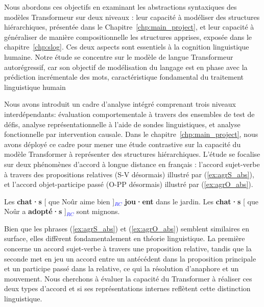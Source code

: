 Nous abordons ces objectifs en examinant les abstractions syntaxiques des modèles Transformeur sur deux niveaux : leur capacité à modéliser des structures hiérarchiques, présentée dans le Chapitre~\ref{chp:main_project}, et leur capacité à généraliser de manière compositionnelle les structures apprises, exposée dans le chapitre~\ref{chp:slog}. Ces deux aspects sont essentiels à la cognition linguistique humaine. Notre étude se concentre sur le modèle de langue Transformeur autorégressif, car son objectif de modélisation du langage est en phase avec la prédiction incrémentale des mots, caractéristique fondamental du traitement linguistique humain~\citep{hale2001probabilistic,kuperberg2016we,levy2008expectation}

Nous avons introduit un cadre d'analyse intégré comprenant trois niveaux interdépendants: évaluation comportementale à travers des ensembles de test de défis, analyse représentationnelle à l'aide de sondes linguistiques, et analyse fonctionnelle par intervention causale. Dans le chapitre~\ref{chp:main_project}, nous avons déployé ce cadre pour mener une étude contrastive sur la capacité du modèle Transformer à représenter des structures hiérarchiques. L’étude se focalise sur deux phénomènes d’accord à longue distance en français : l'accord sujet-verbe à travers des propositions relatives (S-V désormais) illustré par (\ref{ex:agrS_abs}), et l'accord objet-participe passé (O-PP désormais) illustré par (\ref{ex:agrO_abs}).

\setcounter{exx}{0} %
\vspace{-0.8\baselineskip}
\begin{exe}
   \ex\label{ex:agrS_abs}
    Les \textbf{chat·s} [ que Noûr aime bien
  ]\textcolor{blue}{$_{RC}$} \textbf{jou·ent} dans le jardin. 
  \vspace{-0.2\baselineskip}
   \ex\label{ex:agrO_abs}
   Les \textbf{chat·s} [ que Noûr a \textbf{adopté·s} ]\textcolor{blue}{$_{RC}$} sont mignons.
\end{exe} 
\vspace{-0.8\baselineskip}
Bien que les phrases (\ref{ex:agrS_abs}) et (\ref{ex:agrO_abs}) semblent similaires en surface, elles diffèrent fondamentalement en théorie linguistique. La première concerne un accord sujet-verbe à travers une proposition relative, tandis que la seconde met en jeu un accord entre un antécédent dans la proposition principale et un participe passé dans la relative, ce qui la résolution d'anaphore et un mouvement. Nous cherchons à évaluer la capacité du Transformer à réaliser ces deux types d’accord et si ses représentations internes reflètent cette distinction linguistique.


